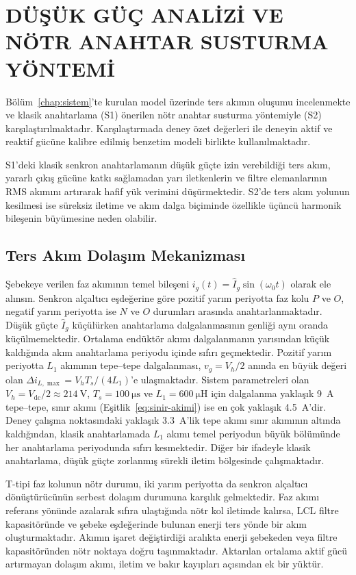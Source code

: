 \chapter{DÜŞÜK GÜÇ ANALİZİ VE NÖTR ANAHTAR SUSTURMA YÖNTEMİ}
\label{chap:anahtarlama}

Bölüm~\ref{chap:sistem}'te kurulan model üzerinde ters akımın oluşumu incelenmekte ve klasik anahtarlama (S1) önerilen nötr anahtar susturma yöntemiyle (S2) karşılaştırılmaktadır. Karşılaştırmada deney özet değerleri ile deneyin aktif ve reaktif gücüne kalibre edilmiş benzetim modeli birlikte kullanılmaktadır.

S1'deki klasik senkron anahtarlamanın düşük güçte izin verebildiği ters akım, yararlı çıkış gücüne katkı sağlamadan yarı iletkenlerin ve filtre elemanlarının RMS akımını artırarak hafif yük verimini düşürmektedir. S2'de ters akım yolunun kesilmesi ise süreksiz iletime ve akım dalga biçiminde özellikle üçüncü harmonik bileşenin büyümesine neden olabilir.

\section{Ters Akım Dolaşım Mekanizması}
\label{sec:ters-akim-mekanizmasi}

Şebekeye verilen faz akımının temel bileşeni $i_g(t)=\hat I_g\sin(\omega_0t)$ olarak ele alınsın. Senkron alçaltıcı eşdeğerine göre pozitif yarım periyotta faz kolu $P$ ve $O$, negatif yarım periyotta ise $N$ ve $O$ durumları arasında anahtarlanmaktadır. Düşük güçte $\hat I_g$ küçülürken anahtarlama dalgalanmasının genliği aynı oranda küçülmemektedir. Ortalama endüktör akımı dalgalanmanın yarısından küçük kaldığında akım anahtarlama periyodu içinde sıfırı geçmektedir. Pozitif yarım periyotta $L_1$ akımının tepe--tepe dalgalanması, $v_g=V_h/2$ anında en büyük değeri olan $\Delta i_{L,\max}=V_hT_s/(4L_1)$'e ulaşmaktadır. Sistem parametreleri olan $V_h=V_{\mathrm{dc}}/2\approx\SI{214}{\volt}$, $T_s=\SI{100}{\micro\second}$ ve $L_1=\SI{600}{\micro\henry}$ için dalgalanma yaklaşık \SI{9}{\ampere} tepe--tepe, sınır akımı (Eşitlik~\eqref{eq:sinir-akimi}) ise en çok yaklaşık \SI{4.5}{\ampere}'dir. Deney çalışma noktasındaki yaklaşık \SI{3.3}{\ampere}'lik tepe akımı sınır akımının altında kaldığından, klasik anahtarlamada $L_1$ akımı temel periyodun büyük bölümünde her anahtarlama periyodunda sıfırı kesmektedir. Diğer bir ifadeyle klasik anahtarlama, düşük güçte zorlanmış sürekli iletim bölgesinde çalışmaktadır.

T-tipi faz kolunun nötr durumu, iki yarım periyotta da senkron alçaltıcı dönüştürücünün serbest dolaşım durumuna karşılık gelmektedir. Faz akımı referans yönünde azalarak sıfıra ulaştığında nötr kol iletimde kalırsa, LCL filtre kapasitöründe ve şebeke eşdeğerinde bulunan enerji ters yönde bir akım oluşturmaktadır. Akımın işaret değiştirdiği aralıkta enerji şebekeden veya filtre kapasitöründen nötr noktaya doğru taşınmaktadır. Aktarılan ortalama aktif gücü artırmayan dolaşım akımı, iletim ve bakır kayıpları açısından ek bir yüktür.

